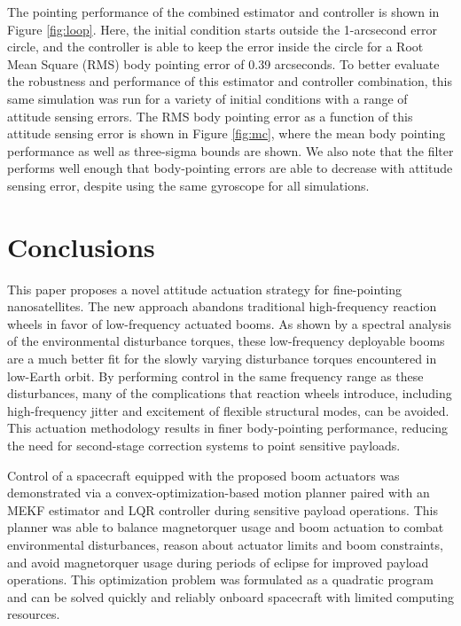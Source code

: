 The pointing performance of the combined estimator and controller is shown in Figure \ref{fig:loop}. Here, the initial condition starts outside the 1-arcsecond error circle, and the controller is able to keep the error inside the circle for a Root Mean Square (RMS) body pointing error of 0.39 arcseconds. To better evaluate the robustness and performance of this estimator and controller combination, this same simulation was run for a variety of initial conditions with a range of attitude sensing errors. The RMS body pointing error as a function of this attitude sensing error is shown in Figure \ref{fig:mc}, where the mean body pointing performance as well as three-sigma bounds are shown. We also note that the filter performs well enough that body-pointing errors are able to decrease with attitude sensing error, despite using the same gyroscope for all simulations. 
\section{Conclusions}
\label{sec:wigglesat:conclusion}
This paper proposes a novel attitude actuation strategy for fine-pointing nanosatellites. The new approach abandons traditional high-frequency reaction wheels in favor of low-frequency actuated booms. As shown by a spectral analysis of the environmental disturbance torques, these low-frequency deployable booms are a much better fit for the slowly varying disturbance torques encountered in low-Earth orbit. By performing control in the same frequency range as these disturbances, many of the complications that reaction wheels introduce, including high-frequency jitter and excitement of flexible structural modes, can be avoided. This actuation methodology results in finer body-pointing performance, reducing the need for second-stage correction systems to point sensitive payloads.

Control of a spacecraft equipped with the proposed boom actuators was demonstrated via a convex-optimization-based motion planner paired with an MEKF estimator and LQR controller during sensitive payload operations. This planner was able to balance magnetorquer usage and boom actuation to combat environmental disturbances, reason about actuator limits and boom constraints, and avoid magnetorquer usage during periods of eclipse for improved payload operations. This optimization problem was formulated as a quadratic program and can be solved quickly and reliably onboard spacecraft with limited computing resources. 




